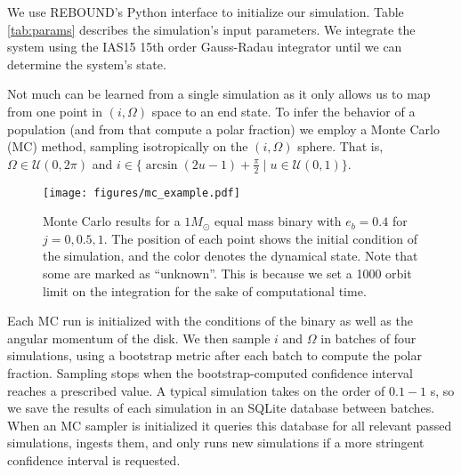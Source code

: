 \documentclass[twocolumn]{aastex631}
\begin{document}
We use {\sc REBOUND}'s Python interface to initialize our simulation. Table \ref{tab:params} describes the simulation's
input parameters. We integrate the system using the IAS15 15th order Gauss-Radau integrator \citep{reboundias15}
until we can determine the system's state.

Not much can be learned from a single simulation as it only allows us to map from one point in $(i,\Omega)$ space to an end state. To infer the behavior of a population
(and from that compute a polar fraction) we employ a Monte Carlo (MC) method, sampling isotropically on the $(i,\Omega)$ sphere. That is, $\Omega \in \mathcal{U}(0,2\pi)$
and $i \in \{\arcsin{(2u-1)} + \frac{\pi}{2} \mid u \in \mathcal{U}(0,1)\}$.

\begin{figure*}
    \begin{centering}
        \texttt{[image: figures/mc\_example.pdf]}
        \caption{Monte Carlo results for a $1 M_\odot$ equal mass binary with $e_b=0.4$ for $j=0,0.5,1$. The position of each
        point shows the initial condition of the simulation, and the color denotes the dynamical state. Note that some are marked
        as ``unknown''. This is because we set a 1000 orbit limit on the integration for the sake of computational time.}
        \label{fig:mc}
    \end{centering}
\end{figure*}

Each MC run is initialized with the conditions of the binary as well as the angular momentum of the disk. We then sample $i$ and $\Omega$ in batches of four simulations,
using a bootstrap metric after each batch to compute the polar fraction. Sampling stops when the bootstrap-computed confidence interval reaches a prescribed value. A 
typical simulation takes on the order of $0.1-1$ s, so we save the results of each simulation in an SQLite database between batches. When an MC sampler is initialized
it queries this database for all relevant passed simulations, ingests them, and only runs new simulations if a more stringent confidence interval is requested.
\end{document}
